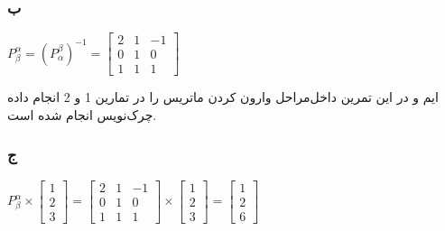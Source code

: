 \setRTL
\subsubsection*{ب}
\setLTR
$
P^\alpha_\beta = (P^\beta_{\alpha})^{-1} = 
\begin{bmatrix}
	2 & 1 & -1 \\
	0 & 1 & 0 \\
	1 & 1 & 1
\end{bmatrix}
$
\setRTL

{\footnotesize مراحل وارون کردن ماتریس را در تمارین 1 و 2 انجام داده‌‎ایم و در این تمرین داخل چرک‌نویس انجام شده است.}


\subsubsection*{ج}
\setLTR
$
P_\beta^\alpha \times \begin{bmatrix}
	1 \\ 2 \\ 3
\end{bmatrix} =\begin{bmatrix}
2 & 1 & -1 \\
0 & 1 & 0 \\
1 &1 & 1
\end{bmatrix} \times \begin{bmatrix}
1 \\ 2 \\ 3
\end{bmatrix} = \begin{bmatrix}
1 \\ 2 \\6
\end{bmatrix}
$
\setRTL